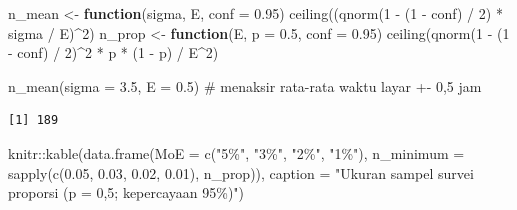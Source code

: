 \documentclass[
  indonesian,
  letterpaper,
]{book}
\newenvironment{Shaded}{\begin{snugshade}}{\end{snugshade}}
\newcommand{\AttributeTok}[1]{\textcolor[rgb]{0.40,0.45,0.13}{#1}}
\newcommand{\CommentTok}[1]{\textcolor[rgb]{0.37,0.37,0.37}{#1}}
\newcommand{\ControlFlowTok}[1]{\textcolor[rgb]{0.00,0.23,0.31}{\textbf{#1}}}
\newcommand{\DecValTok}[1]{\textcolor[rgb]{0.68,0.00,0.00}{#1}}
\newcommand{\FloatTok}[1]{\textcolor[rgb]{0.68,0.00,0.00}{#1}}
\newcommand{\FunctionTok}[1]{\textcolor[rgb]{0.28,0.35,0.67}{#1}}
\newcommand{\NormalTok}[1]{\textcolor[rgb]{0.00,0.23,0.31}{#1}}
\newcommand{\OtherTok}[1]{\textcolor[rgb]{0.00,0.23,0.31}{#1}}
\newcommand{\SpecialCharTok}[1]{\textcolor[rgb]{0.37,0.37,0.37}{#1}}
\newcommand{\StringTok}[1]{\textcolor[rgb]{0.13,0.47,0.30}{#1}}
\begin{document}
\begin{Shaded}
\begin{Highlighting}[]
\NormalTok{n\_mean }\OtherTok{\textless{}{-}} \ControlFlowTok{function}\NormalTok{(sigma, E, }\AttributeTok{conf =} \FloatTok{0.95}\NormalTok{) }\FunctionTok{ceiling}\NormalTok{((}\FunctionTok{qnorm}\NormalTok{(}\DecValTok{1} \SpecialCharTok{{-}}\NormalTok{ (}\DecValTok{1} \SpecialCharTok{{-}}\NormalTok{ conf) }\SpecialCharTok{/} \DecValTok{2}\NormalTok{) }\SpecialCharTok{*}\NormalTok{ sigma }\SpecialCharTok{/}\NormalTok{ E)}\SpecialCharTok{\^{}}\DecValTok{2}\NormalTok{)}
\NormalTok{n\_prop }\OtherTok{\textless{}{-}} \ControlFlowTok{function}\NormalTok{(E, }\AttributeTok{p =} \FloatTok{0.5}\NormalTok{, }\AttributeTok{conf =} \FloatTok{0.95}\NormalTok{) }\FunctionTok{ceiling}\NormalTok{(}\FunctionTok{qnorm}\NormalTok{(}\DecValTok{1} \SpecialCharTok{{-}}\NormalTok{ (}\DecValTok{1} \SpecialCharTok{{-}}\NormalTok{ conf) }\SpecialCharTok{/} \DecValTok{2}\NormalTok{)}\SpecialCharTok{\^{}}\DecValTok{2} \SpecialCharTok{*}\NormalTok{ p }\SpecialCharTok{*}\NormalTok{ (}\DecValTok{1} \SpecialCharTok{{-}}\NormalTok{ p) }\SpecialCharTok{/}\NormalTok{ E}\SpecialCharTok{\^{}}\DecValTok{2}\NormalTok{)}

\FunctionTok{n\_mean}\NormalTok{(}\AttributeTok{sigma =} \FloatTok{3.5}\NormalTok{, }\AttributeTok{E =} \FloatTok{0.5}\NormalTok{)    }\CommentTok{\# menaksir rata{-}rata waktu layar +{-} 0,5 jam}
\end{Highlighting}
\end{Shaded}

\begin{verbatim}
[1] 189
\end{verbatim}

\begin{Shaded}
\begin{Highlighting}[]
\NormalTok{knitr}\SpecialCharTok{::}\FunctionTok{kable}\NormalTok{(}\FunctionTok{data.frame}\NormalTok{(}\AttributeTok{MoE =} \FunctionTok{c}\NormalTok{(}\StringTok{"5\%"}\NormalTok{, }\StringTok{"3\%"}\NormalTok{, }\StringTok{"2\%"}\NormalTok{, }\StringTok{"1\%"}\NormalTok{),}
                 \AttributeTok{n\_minimum =} \FunctionTok{sapply}\NormalTok{(}\FunctionTok{c}\NormalTok{(}\FloatTok{0.05}\NormalTok{, }\FloatTok{0.03}\NormalTok{, }\FloatTok{0.02}\NormalTok{, }\FloatTok{0.01}\NormalTok{), n\_prop)),}
      \AttributeTok{caption =} \StringTok{"Ukuran sampel survei proporsi (p = 0,5; kepercayaan 95\%)"}\NormalTok{)}
\end{Highlighting}
\end{Shaded}
\end{document}
